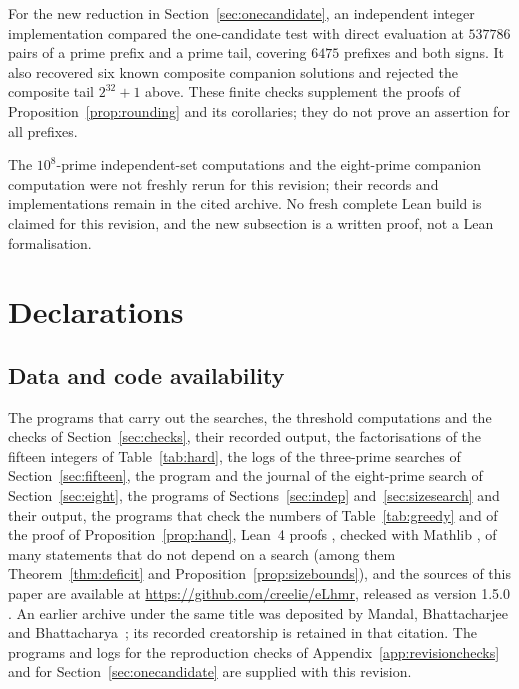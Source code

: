 \documentclass[screen,reqno]{aomart}
\numberwithin{equation}{section}
\theoremstyle{plain}
\theoremstyle{definition}
\theoremstyle{remark}
\newcommand{\releaseline}{, released as version 1.5.0 \cite{Data}}
\begin{document}
For the new reduction in Section~\ref{sec:onecandidate}, an
independent integer implementation compared the one-candidate test
with direct evaluation at $537786$ pairs of a prime prefix and a
prime tail, covering $6475$ prefixes and both signs. It also recovered
six known composite companion solutions and rejected the composite
tail $2^{32}+1$ above. These finite checks supplement the proofs of
Proposition~\ref{prop:rounding} and its corollaries; they do not prove
an assertion for all prefixes.

The $10^8$-prime independent-set computations and the eight-prime
companion computation were not freshly rerun for this revision;
their records and implementations remain in the cited archive.
No fresh complete Lean build is claimed for this revision, and the
new subsection is a written proof, not a Lean formalisation.



\section*{Declarations}

\subsection*{Data and code availability}
The programs that carry out the searches, the threshold computations
and the checks of Section~\ref{sec:checks}, their recorded output, the
factorisations of the fifteen integers of Table~\ref{tab:hard}, the
logs of the three-prime searches of Section~\ref{sec:fifteen}, the
program and the journal of the eight-prime search of
Section~\ref{sec:eight}, the programs of Sections~\ref{sec:indep}
and~\ref{sec:sizesearch} and their output, the programs that check the
numbers of Table~\ref{tab:greedy} and of the proof of
Proposition~\ref{prop:hand}, Lean~4 proofs \cite{dMU21}, checked
with Mathlib \cite{Mathlib}, of many statements that do not depend on
a search (among them Theorem~\ref{thm:deficit} and
Proposition~\ref{prop:sizebounds}), and the sources of this paper are
available at
\url{https://github.com/creelie/eLhmr}\releaseline.
An earlier archive under the same title was deposited by Mandal,
Bhattacharjee and Bhattacharya~\cite{EarlierData}; its recorded
creatorship is retained in that citation. The programs and logs for
the reproduction checks of Appendix~\ref{app:revisionchecks} and for
Section~\ref{sec:onecandidate} are supplied with this revision.
\end{document}
